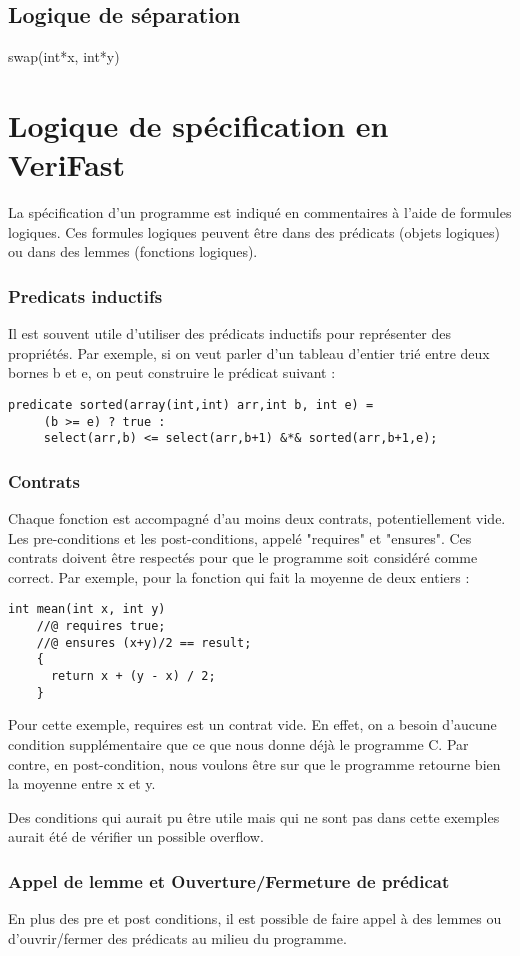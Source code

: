 \documentclass[9pt]{book}
\newcommand{\verifast}{VeriFast}
\begin{document}
		\subsection{Logique de s\'eparation}
			swap(int*x, int*y)
	\section{Logique de sp\'ecification en \verifast{}}
		La sp\'ecification d'un programme est indiqu\'e en commentaires \`a l'aide de formules logiques. Ces formules logiques peuvent \^etre dans des pr\'edicats (objets logiques) ou dans des lemmes (fonctions logiques).
		\subsubsection{Predicats inductifs}
			Il est souvent utile d'utiliser des pr\'edicats inductifs pour repr\'esenter des propri\'et\'es. Par exemple, si on veut parler d'un tableau d'entier tri\'e entre deux bornes b et e, on peut construire le pr\'edicat suivant :
			\begin{lstlisting}
predicate sorted(array(int,int) arr,int b, int e) =
     (b >= e) ? true :
     select(arr,b) <= select(arr,b+1) &*& sorted(arr,b+1,e);
			\end{lstlisting}
		\subsubsection{Contrats}
			Chaque fonction est accompagn\'e d'au moins deux contrats, potentiellement vide. Les pre-conditions et les post-conditions, appel\'e "requires" et "ensures". Ces contrats doivent \^etre respect\'es pour que le programme soit consid\'er\'e comme correct. Par exemple, pour la fonction qui fait la moyenne de deux entiers :
			\begin{lstlisting}
int mean(int x, int y)
	//@ requires true;
	//@ ensures (x+y)/2 == result;
	{
	  return x + (y - x) / 2;
	}
			\end{lstlisting}
	Pour cette exemple, requires est un contrat vide. En effet, on a besoin d'aucune condition suppl\'ementaire que ce que nous donne d\'ej\`a le programme C. Par contre, en post-condition, nous voulons \^etre sur que le programme retourne bien la moyenne entre x et y.\par
	Des conditions qui aurait pu \^etre utile mais qui ne sont pas dans cette exemples aurait \'et\'e de v\'erifier un possible overflow.
		\subsubsection{Appel de lemme et Ouverture/Fermeture de pr\'edicat}
			En plus des pre et post conditions, il est possible de faire appel \`a des lemmes ou d'ouvrir/fermer des pr\'edicats au milieu du programme.
\end{document}
